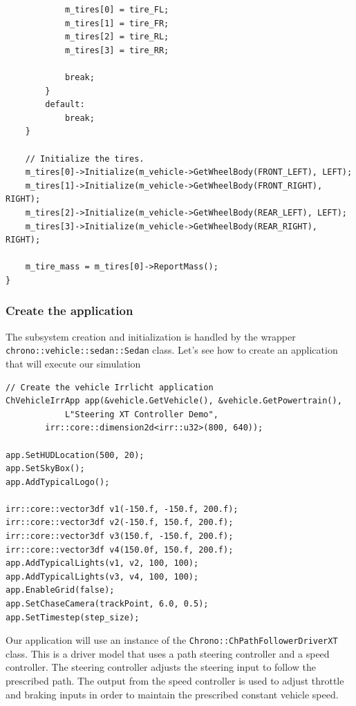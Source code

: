 \begin{lstlisting}
            m_tires[0] = tire_FL;
            m_tires[1] = tire_FR;
            m_tires[2] = tire_RL;
            m_tires[3] = tire_RR;

            break;
        }
        default:
            break;
    }

    // Initialize the tires.
    m_tires[0]->Initialize(m_vehicle->GetWheelBody(FRONT_LEFT), LEFT);
    m_tires[1]->Initialize(m_vehicle->GetWheelBody(FRONT_RIGHT), RIGHT);
    m_tires[2]->Initialize(m_vehicle->GetWheelBody(REAR_LEFT), LEFT);
    m_tires[3]->Initialize(m_vehicle->GetWheelBody(REAR_RIGHT), RIGHT);

    m_tire_mass = m_tires[0]->ReportMass();
}

\end{lstlisting}



\subsubsection{Create the application}

The subsystem creation and initialization is handled by the wrapper \lstinline{chrono::vehicle::sedan::Sedan} class. Let's see how to create
an application that will execute our simulation

\begin{lstlisting}
// Create the vehicle Irrlicht application
ChVehicleIrrApp app(&vehicle.GetVehicle(), &vehicle.GetPowertrain(), 
		    L"Steering XT Controller Demo", 
        irr::core::dimension2d<irr::u32>(800, 640));

app.SetHUDLocation(500, 20);
app.SetSkyBox();
app.AddTypicalLogo();

irr::core::vector3df v1(-150.f, -150.f, 200.f);
irr::core::vector3df v2(-150.f, 150.f, 200.f);
irr::core::vector3df v3(150.f, -150.f, 200.f);
irr::core::vector3df v4(150.0f, 150.f, 200.f); 
app.AddTypicalLights(v1, v2, 100, 100);
app.AddTypicalLights(v3, v4, 100, 100);
app.EnableGrid(false);
app.SetChaseCamera(trackPoint, 6.0, 0.5);
app.SetTimestep(step_size);
\end{lstlisting}

Our application will use an instance of the \lstinline{Chrono::ChPathFollowerDriverXT} class. 
This is a driver model that uses a path steering controller and a speed controller. The steering controller adjusts the steering input to follow the prescribed path. 
The output from the speed controller is used to adjust throttle and braking inputs in order to maintain the prescribed constant vehicle speed.


